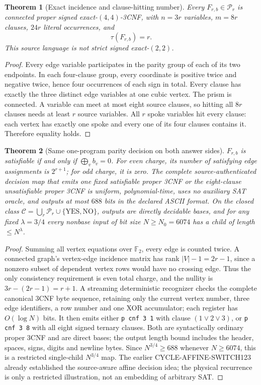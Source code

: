 \documentclass[11pt]{article}
\newtheorem{theorem}{Theorem}
\begin{document}
\begin{theorem}[Exact incidence and clause-hitting number]
Every $F_{r,b}\in\mathcal P_r$ is connected proper signed exact-$(4,4)$-3CNF, with $n=3r$ variables, $m=8r$ clauses, $24r$ literal occurrences, and
\[
 \tau(F_{r,b})=r.
\]
This source language is \emph{not} strict signed exact-$(2,2)$.
\end{theorem}
\begin{proof}
Every edge variable participates in the parity group of each of its two endpoints. In each four-clause group, every coordinate is positive twice and negative twice, hence four occurrences of each sign in total. Every clause has exactly the three distinct edge variables at one cubic vertex. The prism is connected. A variable can meet at most eight source clauses, so hitting all $8r$ clauses needs at least $r$ source variables. All $r$ spoke variables hit every clause: each vertex has exactly one spoke and every one of its four clauses contains it. Therefore equality holds.
\end{proof}

\begin{theorem}[Same one-program parity decision on both answer sides]
$F_{r,b}$ is satisfiable if and only if $\bigoplus_v b_v=0$. For even charge, its number of satisfying edge assignments is $2^{r+1}$; for odd charge, it is zero. The complete source-authenticated decision map that emits one fixed satisfiable proper 3CNF or the eight-clause unsatisfiable proper 3CNF is uniform, polynomial-time, uses no auxiliary SAT oracle, and outputs at most $688$ bits in the declared ASCII format. On the closed class $\mathcal C=\bigcup_r\mathcal P_r\cup\{\mathrm{YES},\mathrm{NO}\}$, outputs are directly decidable bases, and for any fixed $\lambda=3/4$ every nonbase input of bit size $N\ge N_0=6074$ has a child of length $\le N^\lambda$.
\end{theorem}
\begin{proof}
Summing all vertex equations over $\mathbb F_2$, every edge is counted twice. A connected graph's vertex-edge incidence matrix has rank $|V|-1=2r-1$, since a nonzero subset of dependent vertex rows would have no crossing edge. Thus the only consistency requirement is even total charge, and the nullity is $3r-(2r-1)=r+1$. A streaming deterministic recognizer checks the complete canonical 3CNF byte sequence, retaining only the current vertex number, three edge identifiers, a row number and one XOR accumulator; each register has $O(\log N)$ bits. It then emits either \texttt{p cnf 3 1} with clause $(1\vee2\vee3)$, or \texttt{p cnf 3 8} with all eight signed ternary clauses. Both are syntactically ordinary proper 3CNF and are direct bases; the output length bound includes the header, spaces, signs, digits and newline bytes. Since $N^{3/4}\ge688$ whenever $N\ge6074$, this is a restricted single-child $N^{3/4}$ map. The earlier CYCLE-AFFINE-SWITCH123 already established the source-aware affine decision idea; the physical recurrence is only a restricted illustration, not an embedding of arbitrary SAT.
\end{proof}
\end{document}
